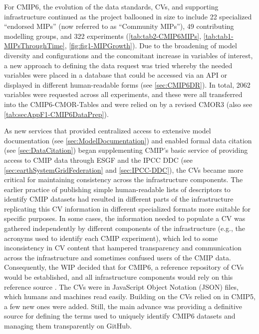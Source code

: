 \documentclass[manuscript]{copernicus}
\begin{document}
For CMIP6, the evolution of the data standards, CVs, and supporting infrastructure continued as the project ballooned in size to include 22 specialized ``endorsed MIPs'' (now referred to as ``Community MIPs''), 49 contributing modelling groups, and 322 experiments (\autoref{tab:tab2-CMIP6MIPs}, \autoref{tab:tab1-MIPsThroughTime}, \autoref{fig:fig1-MIPGrowth}). Due to the broadening of model diversity and configurations and the concomitant increase in variables of interest, a new approach to defining the data request was tried whereby the needed variables were placed in a database that could be accessed via an API or displayed in different human-readable forms (see \autoref{sec:CMIP6DR}). In total, 2062 variables were requested across all experiments, and these were all transferred into the CMIP6-CMOR-Tables \citep{nadeau_cmip6_2017} and were relied on by a revised CMOR3 \citep{mauzey_climate_2025} (also see \autoref{tab:secAppF1-CMIP6DataPrep}).

As new services that provided centralized access to extensive model documentation (see \autoref{sec:ModelDocumentation}) and enabled formal data citation (see \autoref{sec:DataCitation}) began supplementing CMIP's basic service of providing access to CMIP data through ESGF and the IPCC DDC (see \autoref{sec:earthSystemGridFederation} and \autoref{sec:IPCC-DDC}), the CVs became more critical for maintaining consistency across the infrastructure components. The earlier practice of publishing simple human-readable lists of descriptors to identify CMIP datasets had resulted in different parts of the infrastructure replicating this CV information in different specialized formats more suitable for specific purposes. In some cases, the information needed to populate a CV was gathered independently by different components of the infrastructure (e.g., the acronyms used to identify each CMIP experiment), which led to some inconsistency in CV content that hampered transparency and communication across the infrastructure and sometimes confused users of the CMIP data. Consequently, the WIP decided that for CMIP6, a reference repository of CVs would be established, and all infrastructure components would rely on this reference source \citep{durack_cmip6_2024}. The CVs were in JavaScript Object Notation (JSON) files, which humans and machines read easily. Building on the CVs relied on in CMIP5, a few new ones were added. Still, the main advance was providing a definitive source for defining the terms used to uniquely identify CMIP6 datasets and managing them transparently on GitHub.
\end{document}
